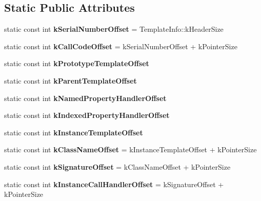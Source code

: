 \subsection*{Static Public Attributes}
\begin{DoxyCompactItemize}
\item 
\hypertarget{classv8_1_1internal_1_1_function_template_info_a546ba76897d5fc9f51f3140e7bb4dbfa}{}static const int {\bfseries k\+Serial\+Number\+Offset} = Template\+Info\+::k\+Header\+Size\label{classv8_1_1internal_1_1_function_template_info_a546ba76897d5fc9f51f3140e7bb4dbfa}

\item 
\hypertarget{classv8_1_1internal_1_1_function_template_info_a64955d670817f4c46b8418a5e142093b}{}static const int {\bfseries k\+Call\+Code\+Offset} = k\+Serial\+Number\+Offset + k\+Pointer\+Size\label{classv8_1_1internal_1_1_function_template_info_a64955d670817f4c46b8418a5e142093b}

\item 
static const int {\bfseries k\+Prototype\+Template\+Offset}
\item 
static const int {\bfseries k\+Parent\+Template\+Offset}
\item 
static const int {\bfseries k\+Named\+Property\+Handler\+Offset}
\item 
static const int {\bfseries k\+Indexed\+Property\+Handler\+Offset}
\item 
static const int {\bfseries k\+Instance\+Template\+Offset}
\item 
\hypertarget{classv8_1_1internal_1_1_function_template_info_a7599e8be26fa10816008af1ca12a59c6}{}static const int {\bfseries k\+Class\+Name\+Offset} = k\+Instance\+Template\+Offset + k\+Pointer\+Size\label{classv8_1_1internal_1_1_function_template_info_a7599e8be26fa10816008af1ca12a59c6}

\item 
\hypertarget{classv8_1_1internal_1_1_function_template_info_a46ed1c6bf24edb069411dcd0a0773047}{}static const int {\bfseries k\+Signature\+Offset} = k\+Class\+Name\+Offset + k\+Pointer\+Size\label{classv8_1_1internal_1_1_function_template_info_a46ed1c6bf24edb069411dcd0a0773047}

\item 
\hypertarget{classv8_1_1internal_1_1_function_template_info_a56173d05992d27484b5782160f795588}{}static const int {\bfseries k\+Instance\+Call\+Handler\+Offset} = k\+Signature\+Offset + k\+Pointer\+Size\label{classv8_1_1internal_1_1_function_template_info_a56173d05992d27484b5782160f795588}


\end{DoxyCompactItemize}
